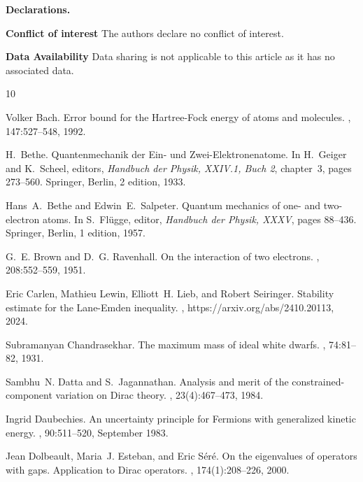 \documentclass[a4paper]{amsart}
\begin{document}
{\bf Declarations.}\medskip

{\bf Conflict of interest} The authors declare no conflict of interest.\medskip

{\bf Data Availability} Data sharing is not applicable to this article as it has no associated data.


%
%
\def\cprime{$'$}
\begin{thebibliography}{10}

Volker Bach.
\newblock Error bound for the {H}artree-{F}ock energy of atoms and molecules.
, 147:527--548, 1992.

H.\ Bethe.
\newblock Quantenmechanik der {E}in- und {Z}wei-{E}lektronenatome.
\newblock In H.\ Geiger and K.\ Scheel, editors, {\em Handbuch der {P}hysik,
  {XXIV.1}, {B}uch 2}, chapter~3, pages 273--560. Springer, Berlin, 2 edition,
  1933.

Hans~A.\ Bethe and Edwin~E.\ Salpeter.
\newblock Quantum mechanics of one- and two-electron atoms.
\newblock In S.\ Fl{\"u}gge, editor, {\em Handbuch der {P}hysik, {XXXV}}, pages
  88--436. Springer, Berlin, 1 edition, 1957.

G.~E. Brown and D.~G. Ravenhall.
\newblock On the interaction of two electrons.
, 208:552--559, 1951.

Eric Carlen, Mathieu Lewin, Elliott~H. Lieb, and Robert Seiringer.
\newblock Stability estimate for the {L}ane-{E}mden inequality.
, https://arxiv.org/abs/2410.20113, 2024.

Subramanyan Chandrasekhar.
\newblock The maximum mass of ideal white dwarfs.
, 74:81--82, 1931.

Sambhu~N. Datta and S.~Jagannathan.
\newblock Analysis and merit of the constrained-component variation on {D}irac
  theory.
, 23(4):467--473, 1984.

Ingrid Daubechies.
\newblock An uncertainty principle for {F}ermions with generalized kinetic
  energy.
, 90:511--520, September 1983.

Jean Dolbeault, Maria~J. Esteban, and Eric S{\'e}r{\'e}.
\newblock On the eigenvalues of operators with gaps. {A}pplication to {D}irac
  operators.
, 174(1):208--226, 2000.


\end{thebibliography}
\end{document}

